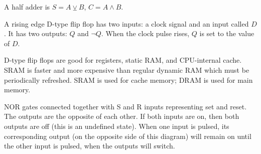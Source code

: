 \documentclass[../main.tex]{subfile}
\begin{document}

A half adder is $S = A \veebar B$, $C = A \wedge B$.

\begin{center}
\end{center}


A rising edge D-type flip flop has two inputs: a clock signal and an input called $D$. It has two outputs: $Q$ and $\neg Q$. When the clock pulse rises, $Q$ is set to the value of $D$.

D-type flip flops are good for registers, static RAM, and CPU-internal cache. SRAM is faster and more expensive than regular dynamic RAM which must be periodically refreshed. SRAM is used for cache memory; DRAM is used for main memory.


NOR gates connected together with S and R inputs representing set and reset. The outputs are the opposite of each other. If both inputs are on, then both outputs are off (this is an undefined state). When one input is pulsed, its corresponding output (on the opposite side of this diagram) will remain on until the other input is pulsed, when the outputs will switch.
\end{document}

